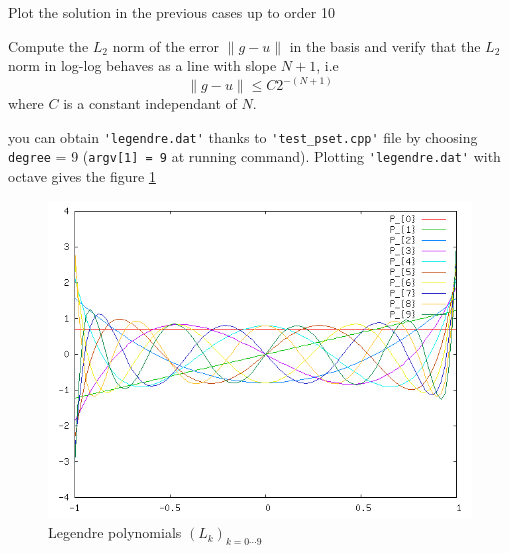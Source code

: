 \documentclass{article}
\begin{document}
\begin{Exercise}[title={p type Galerkin method in 1D}]
  \Question Plot the solution in the previous cases up to order 10

  \Question Compute the $L_2$ norm of the error $\|g-u\|$ in the basis
  and verify that the $L_2$ norm in log-log behaves as a line with slope $N+1$, i.e
  \begin{equation}
    \label{eq:13}
    \|g-u\| \leq C 2^{-(N+1)}
  \end{equation}
  where $C$ is a constant independant of $N$.
\end{Exercise}

\begin{Answer}
  \Question you can obtain \verb+'legendre.dat'+ thanks to
  \verb+'test_pset.cpp'+ file by choosing \verb+degree+ = 9
  (\verb+argv[1] = 9+ at running command).
Plotting \verb+'legendre.dat'+ with octave gives the figure \ref{fig:1}
\begin{figure}[h]
  \label{fig:1}
  \centering
  \includegraphics[scale=0.4]{legendre.png}
  \caption{Legendre polynomials $(L_k)_{k=0 \cdots 9}$}
\end{figure}

\end{Answer}
\end{document}
